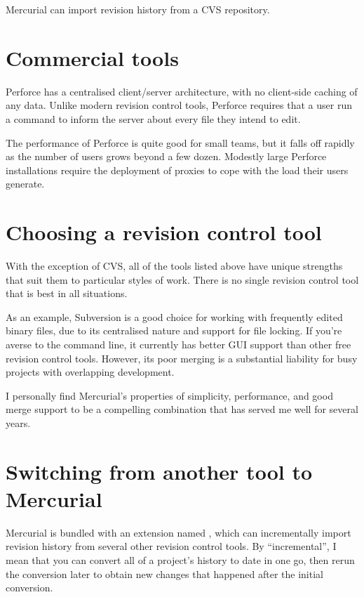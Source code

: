 Mercurial can import revision history from a CVS repository.


\section{Commercial tools}

Perforce has a centralised client/server architecture, with no
client-side caching of any data.  Unlike modern revision control
tools, Perforce requires that a user run a command to inform the
server about every file they intend to edit.

The performance of Perforce is quite good for small teams, but it
falls off rapidly as the number of users grows beyond a few dozen.
Modestly large Perforce installations require the deployment of
proxies to cope with the load their users generate.


\section{Choosing a revision control tool}

With the exception of CVS, all of the tools listed above have unique
strengths that suit them to particular styles of work.  There is no
single revision control tool that is best in all situations.

As an example, Subversion is a good choice for working with frequently
edited binary files, due to its centralised nature and support for
file locking.  If you're averse to the command line, it currently has
better GUI support than other free revision control tools.  However,
its poor merging is a substantial liability for busy projects with
overlapping development.

I personally find Mercurial's properties of simplicity, performance,
and good merge support to be a compelling combination that has served
me well for several years.


\section{Switching from another tool to Mercurial}

Mercurial is bundled with an extension named , which
can incrementally import revision history from several other revision
control tools.  By ``incremental'', I mean that you can convert all of
a project's history to date in one go, then rerun the conversion later
to obtain new changes that happened after the initial conversion.

